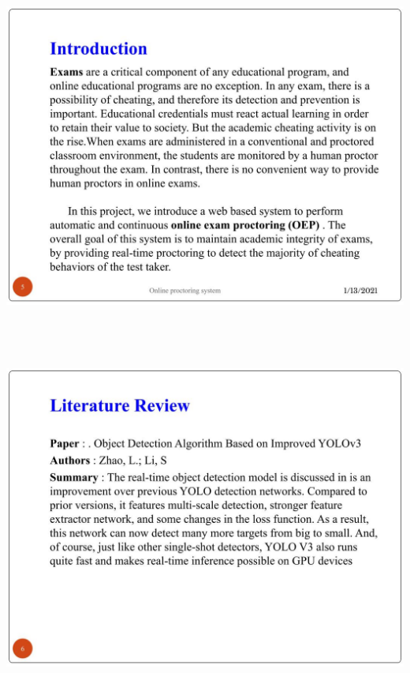 \documentclass[12pt]{report}
\begin{document}
\includegraphics[width=17cm,height=12cm]{INTERNSHIP SAMPLE PRESENTATION (4)}\\
\includegraphics[width=17cm,height=12cm]{INTERNSHIP SAMPLE PRESENTATION (5)}\\
\end{document}
